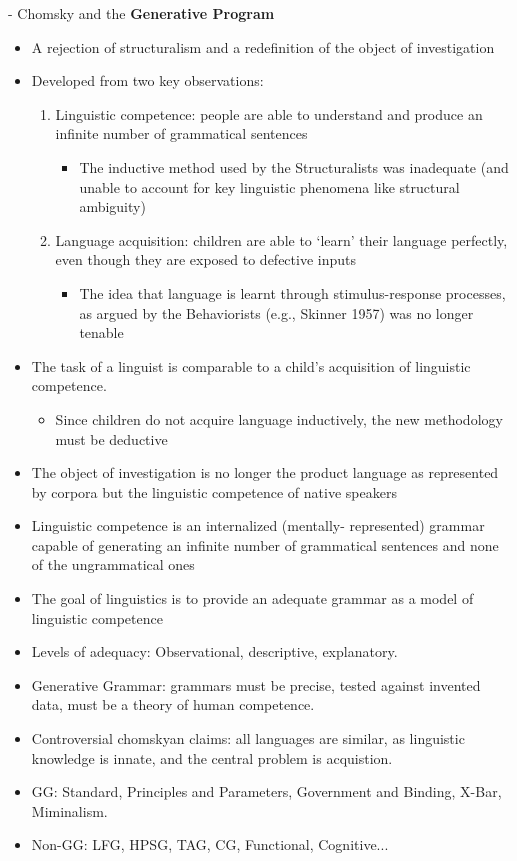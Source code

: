\documentclass[11pt]{article}
\begin{document}
- Chomsky and the \textbf{Generative Program}
\begin{itemize}
\item A rejection of structuralism and a redefinition of the object of investigation
\item Developed from two key observations:
  \begin{enumerate}
  \item Linguistic competence: people are able to understand and produce an infinite number of grammatical sentences
    \begin{itemize}
    \item The inductive method used by the Structuralists was inadequate (and unable to account for key linguistic phenomena like structural ambiguity)
    \end{itemize}
  \item Language acquisition: children are able to ‘learn’ their language perfectly, even though they are exposed to defective inputs
    \begin{itemize}
    \item The idea that language is learnt through stimulus-response processes, as argued by the Behaviorists (e.g., Skinner 1957) was no longer tenable
    \end{itemize}
  \end{enumerate}
\item The task of a linguist is comparable to a child’s acquisition of linguistic competence.
  \begin{itemize}
  \item Since children do not acquire language inductively, the new methodology must be deductive
  \end{itemize}
\item The object of investigation is no longer the product language as represented by corpora but the linguistic competence of native speakers
\item Linguistic competence is an internalized (mentally- represented) grammar capable of generating an infinite number of grammatical sentences and none of the ungrammatical ones
\item The goal of linguistics is to provide an adequate grammar as a model of linguistic competence
\item Levels of adequacy: Observational, descriptive, explanatory. 
\item Generative Grammar: grammars must be precise, tested against invented data, must be a theory of human competence. 
\item Controversial chomskyan claims: all languages are similar, as linguistic knowledge is innate, and the central problem is acquistion. 
\item GG: Standard, Principles and Parameters, Government and Binding, X-Bar, Miminalism.
\item Non-GG: LFG, HPSG, TAG, CG, Functional, Cognitive...
\end{itemize}
\end{document}
